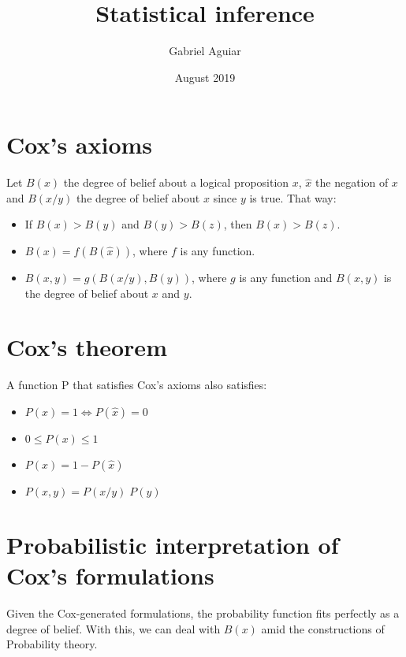 \documentclass{article}
\title{Statistical inference}
\author{Gabriel Aguiar}
\date{August 2019}
\begin{document}
\maketitle

\section{Cox's axioms}

Let $B(x)$ the degree of belief about a logical proposition $x$, $\hat{x}$ the negation of $x$ and $B(x/y)$ the degree of belief about $x$ since $y$ is true. That way:

\begin{itemize}

\item If $B(x) > B(y)$ and $B(y) > B(z)$, then $B(x) > B(z)$.

\item $B(x) = f(B(\hat{x}))$, where $f$ is any function.

\item $B(x,y) = g(B(x/y),B(y))$, where $g$ is any function and $B(x,y)$ is the degree of belief about $x$ and $y$.

\end{itemize}

\section{Cox's theorem}

A function P that satisfies Cox's axioms also satisfies:

\begin{itemize}

\item $P(x) = 1 \Leftrightarrow P(\hat{x}) = 0$

\item $0 \leq P(x) \leq 1$

\item $P(x) = 1 - P(\hat{x})$

\item $P(x,y) = P(x/y) \; P(y)$

\end{itemize}

\section{Probabilistic interpretation of Cox's formulations}

Given the Cox-generated formulations, the probability function fits perfectly as a degree of belief. With this, we can deal with $B(x)$ amid the constructions of Probability theory.
\end{document}

